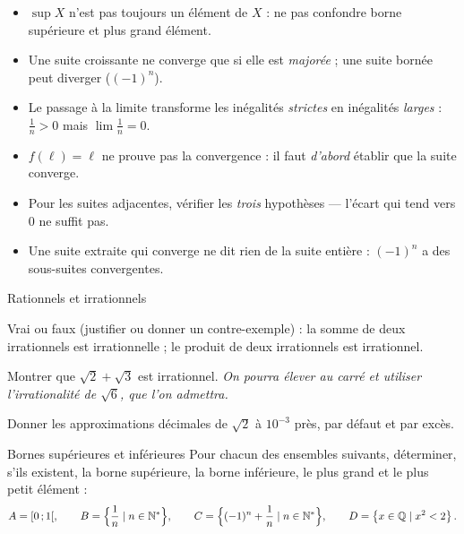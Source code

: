\begin{attention}
\begin{itemize}[label={\color{otOrange}\textbullet},leftmargin=1.4em,itemsep=0.6mm,topsep=0.5mm]
  \item $\sup X$ n'est pas toujours un élément de $X$ : ne pas confondre borne
    supérieure et plus grand élément.
  \item Une suite croissante ne converge que si elle est \emph{majorée} ; une
    suite bornée peut diverger ($(-1)^{n}$).
  \item Le passage à la limite transforme les inégalités \emph{strictes} en
    inégalités \emph{larges} : $\frac1n>0$ mais $\lim\frac1n=0$.
  \item $f(\ell)=\ell$ ne prouve pas la convergence : il faut \emph{d'abord}
    établir que la suite converge.
  \item Pour les suites adjacentes, vérifier les \emph{trois} hypothèses —
    l'écart qui tend vers $0$ ne suffit pas.
  \item Une suite extraite qui converge ne dit rien de la suite entière :
    $(-1)^{n}$ a des sous-suites convergentes.
\end{itemize}
\end{attention}

\exercices
{}

\begin{exercice}[1]{Rationnels et irrationnels}
\begin{questions}
  \item Vrai ou faux (justifier ou donner un contre-exemple) : la somme de
    deux irrationnels est irrationnelle ; le produit de deux irrationnels
    est irrationnel.
  \item Montrer que $\sqrt2+\sqrt3$ est irrationnel.
    \emph{On pourra élever au carré et utiliser l'irrationalité de
    $\sqrt6$, que l'on admettra.}
  \item Donner les approximations décimales de $\sqrt2$ à $10^{-3}$ près,
    par défaut et par excès.
\end{questions}
\end{exercice}

\begin{exercice}[1]{Bornes supérieures et inférieures}
Pour chacun des ensembles suivants, déterminer, s'ils existent, la borne
supérieure, la borne inférieure, le plus grand et le plus petit élément :
\[
  A=\mathopen{[}0\,{;}\,1\mathclose{[},\qquad
  B=\Bigl\{\frac1n \mid n\in\mathbb{N}^{*}\Bigr\},\qquad
  C=\Bigl\{(-1)^{n}+\frac1n \mid n\in\mathbb{N}^{*}\Bigr\},\qquad
  D=\left\{x\in\mathbb{Q} \mid x^{2}<2\right\}.
\]
\end{exercice}


